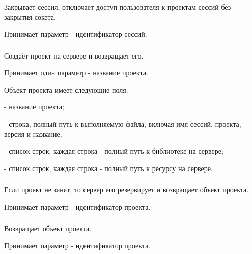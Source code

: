 \subsubsection{}

Закрывает сессия, отключает доступ пользователя к проектам сессий без закрытия сокета.

Принимает параметр  - идентификатор сессий.

\subsubsection{}

Создаёт проект на сервере и возвращает его.

Принимает один параметр  - название проекта.

Объект проекта имеет следующие поля:

\begin{icItems}
	\item {} - название проекта;
	\item {} - строка, полный путь к выполняемую файла, включая имя сессий, проекта, версия и название;
	\item {} - список строк, каждая строка - полный путь к библиотеке на сервере;
	\item {} - список строк, каждая строка - полный путь к ресурсу на сервере.
\end{icItems}

\subsubsection{}

Если проект не занят, то сервер его резервирует и возвращает объект проекта.

Принимает параметр  - идентификатор проекта.

\subsubsection{}

Возвращает объект проекта.

Принимает параметр  - идентификатор проекта.

\subsubsection{}


